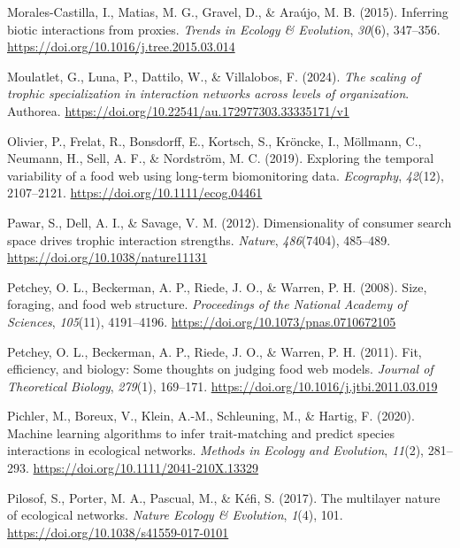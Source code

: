 \documentclass[
]{article}
\newlength{\cslhangindent}
\newenvironment{CSLReferences}[2] %
 {\begin{list}{}{%
  \setlength{\itemindent}{0pt}
  \setlength{\leftmargin}{0pt}
  \setlength{\parsep}{0pt}
  \ifodd #1
   \setlength{\leftmargin}{\cslhangindent}
   \setlength{\itemindent}{-1\cslhangindent}
  \fi
  \setlength{\itemsep}{#2\baselineskip}}}
 {\end{list}}
\begin{document}
\begin{CSLReferences}{1}{0}
Morales-Castilla, I., Matias, M. G., Gravel, D., \& Araújo, M. B.
(2015). Inferring biotic interactions from proxies. \emph{Trends in
Ecology \& Evolution}, \emph{30}(6), 347--356.
\url{https://doi.org/10.1016/j.tree.2015.03.014}

Moulatlet, G., Luna, P., Dattilo, W., \& Villalobos, F. (2024).
\emph{The scaling of trophic specialization in interaction networks
across levels of organization}. Authorea.
\url{https://doi.org/10.22541/au.172977303.33335171/v1}

Olivier, P., Frelat, R., Bonsdorff, E., Kortsch, S., Kröncke, I.,
Möllmann, C., Neumann, H., Sell, A. F., \& Nordström, M. C. (2019).
Exploring the temporal variability of a food web using long-term
biomonitoring data. \emph{Ecography}, \emph{42}(12), 2107--2121.
\url{https://doi.org/10.1111/ecog.04461}

Pawar, S., Dell, A. I., \& Savage, V. M. (2012). Dimensionality of
consumer search space drives trophic interaction strengths.
\emph{Nature}, \emph{486}(7404), 485--489.
\url{https://doi.org/10.1038/nature11131}

Petchey, O. L., Beckerman, A. P., Riede, J. O., \& Warren, P. H. (2008).
Size, foraging, and food web structure. \emph{Proceedings of the
National Academy of Sciences}, \emph{105}(11), 4191--4196.
\url{https://doi.org/10.1073/pnas.0710672105}

Petchey, O. L., Beckerman, A. P., Riede, J. O., \& Warren, P. H. (2011).
Fit, efficiency, and biology: {Some} thoughts on judging food web
models. \emph{Journal of Theoretical Biology}, \emph{279}(1), 169--171.
\url{https://doi.org/10.1016/j.jtbi.2011.03.019}

Pichler, M., Boreux, V., Klein, A.-M., Schleuning, M., \& Hartig, F.
(2020). Machine learning algorithms to infer trait-matching and predict
species interactions in ecological networks. \emph{Methods in Ecology
and Evolution}, \emph{11}(2), 281--293.
\url{https://doi.org/10.1111/2041-210X.13329}

Pilosof, S., Porter, M. A., Pascual, M., \& Kéfi, S. (2017). The
multilayer nature of ecological networks. \emph{Nature Ecology \&
Evolution}, \emph{1}(4), 101.
\url{https://doi.org/10.1038/s41559-017-0101}


\end{CSLReferences}
\end{document}
